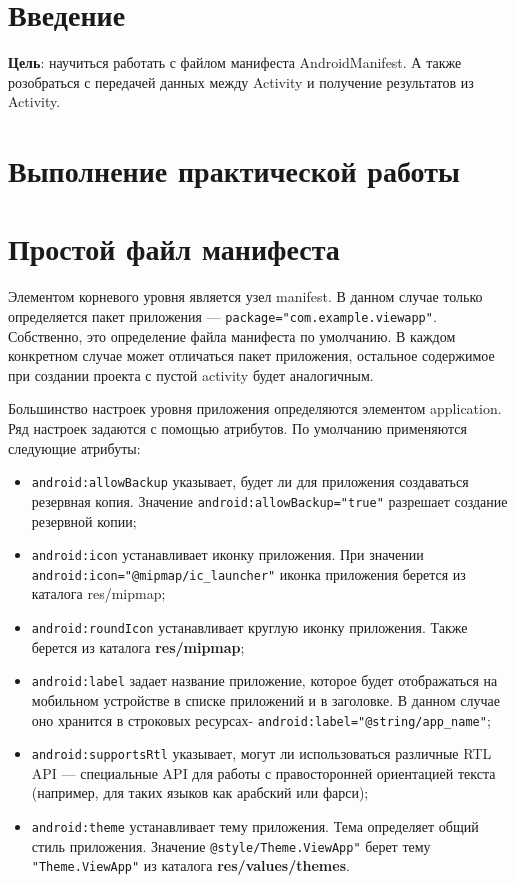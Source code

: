 \graphicspath{{.img}}

\section*{\LARGE{Введение}}
\textbf{Цель}: научиться работать с файлом манифеста AndroidManifest.
А также розобраться с передачей данных между Activity и получение
результатов из Activity.\par

\clearpage

\section*{\LARGE{Выполнение практической работы}}

\section{Простой файл манифеста}
Элементом корневого уровня является узел manifest. В данном случае только
определяется пакет приложения --- \texttt{package="com.example.viewapp"}.
Собственно, это определение файла манифеста по умолчанию. В каждом
конкретном случае может отличаться пакет приложения, остальное
содержимое при создании проекта с пустой activity будет аналогичным.\par
Большинство настроек уровня приложения определяются элементом
application. Ряд настроек задаются с помощью атрибутов. По умолчанию
применяются следующие атрибуты:
\begin{itemize}
	\item \texttt{android:allowBackup} указывает, будет ли для приложения
		создаваться резервная копия. Значение
		\texttt{android:allowBackup="true"} разрешает создание
		резервной копии;
	\item \texttt{android:icon} устанавливает иконку приложения.
		При значении \texttt{android:icon="@mipmap/ic\_launcher"} иконка
		приложения берется из каталога res/mipmap;
	\item \texttt{android:roundIcon} устанавливает круглую иконку приложения.
		Также берется из каталога \textbf{res/mipmap};
	\item \texttt{android:label} задает название приложение, которое будет
		отображаться на мобильном устройстве в списке приложений и в
		заголовке. В данном случае оно хранится в строковых ресурсах-
		\texttt{android:label="@string/app\_name"};
	\item \texttt{android:supportsRtl} указывает, могут ли использоваться
		различные RTL API --- специальные API для работы с правосторонней
		ориентацией текста (например, для таких языков
		как арабский или фарси);
	\item \texttt{android:theme} устанавливает тему приложения.
		Тема определяет общий стиль приложения. Значение
		\texttt{@style/Theme.ViewApp"} берет тему \texttt{"Theme.ViewApp"} из
		каталога \textbf{res/values/themes}.
\end{itemize}

